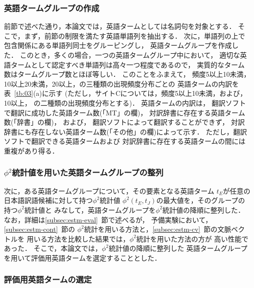 \subsubsection{英語タームグループの作成}

前節で述べた通り，本論文では，英語タームとしては名詞句を対象とする．
そこで，まず，前節の制限を満たす英語単語列を抽出する．
次に，単語列の上で包含関係にある単語列同士をグルーピングし，
英語タームグループを作成した．
このとき，多くの場合，一つの英語タームグループ中において，
適切な英語タームとして認定すべき単語列は高々一つ程度であるので，
実質的なターム数はタームグループ数とほぼ等しい．
このことをふまえて，
頻度5以上10未満，10以上20未満，20以上，の三種類の出現頻度分布ごとの
英語タームの内訳を表~\ref{tb:03}(a)に示す
(ただし，サイトCについては，頻度5以上10未満，および，10以上，
の二種類の出現頻度分布とする)．
英語タームの内訳は，
翻訳ソフトで翻訳に成功した英語ターム数(「MT」の欄)，
対訳辞書に存在する英語ターム数(「辞書」の欄)，
および，
翻訳ソフトによって翻訳することができず，
対訳辞書にも存在しない英語ターム数(「その他」の欄)によって示す．
ただし，翻訳ソフトで翻訳できる英語タームおよび
対訳辞書に存在する英語タームの間には重複があり得る．

\subsubsection{$\phi^2$統計値を用いた英語タームグループの整列}

次に，ある英語タームグループについて，その要素となる英語ターム
$t_E$が任意の日本語訳語候補に対して持つ$\phi^2$統計値
$\phi^2(t_E,t_J)$の最大値を，そのグループの持つ$\phi^2$統計値と
みなして，英語タームグループを$\phi^2$統計値の降順に整列した．
なお，詳細は\ref{subsec:estm-eval}~節で述べるが，
予備実験\cite{Hino04aj}において，\ref{subsec:estm-cont}~節の
$\phi^2$統計を用いる方法と，\ref{subsec:estm-cv}~節の文脈ベクトルを
用いる方法を比較した結果では，$\phi^2$統計を用いた方法の方が
高い性能であった．
そこで，本論文では，$\phi^2$統計値の降順に整列した
英語タームグループを用いて評価用英語タームを選定することとした．

\subsubsection{評価用英語タームの選定}

